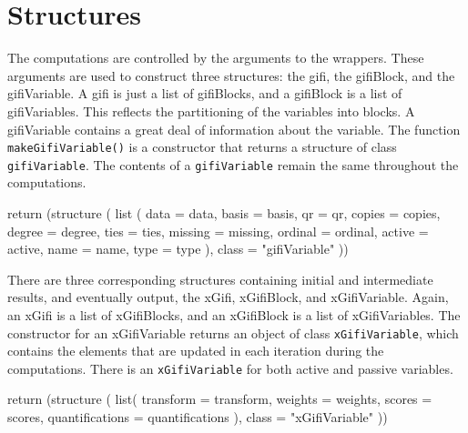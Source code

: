 \documentclass[
  12pt,
  letterpaper,
]{scrbook}
\newenvironment{Shaded}{\begin{snugshade}}{\end{snugshade}}
\newcommand{\AttributeTok}[1]{\textcolor[rgb]{0.40,0.45,0.13}{#1}}
\newcommand{\FunctionTok}[1]{\textcolor[rgb]{0.28,0.35,0.67}{#1}}
\newcommand{\NormalTok}[1]{\textcolor[rgb]{0.00,0.23,0.31}{#1}}
\newcommand{\StringTok}[1]{\textcolor[rgb]{0.13,0.47,0.30}{#1}}
\begin{document}
\section{Structures}\label{structures}

The computations are controlled by the arguments to the wrappers. These
arguments are used to construct three structures: the gifi, the
gifiBlock, and the gifiVariable. A gifi is just a list of gifiBlocks,
and a gifiBlock is a list of gifiVariables. This reflects the
partitioning of the variables into blocks. A gifiVariable contains a
great deal of information about the variable. The function
\texttt{makeGifiVariable()} is a constructor that returns a structure of
class \texttt{gifiVariable}. The contents of a \texttt{gifiVariable}
remain the same throughout the computations.

\begin{Shaded}
\begin{Highlighting}[]
    \FunctionTok{return}\NormalTok{ (}\FunctionTok{structure}\NormalTok{ (}
      \FunctionTok{list}\NormalTok{ (}
        \AttributeTok{data =}\NormalTok{ data,}
        \AttributeTok{basis =}\NormalTok{ basis,}
        \AttributeTok{qr =}\NormalTok{ qr,}
        \AttributeTok{copies =}\NormalTok{ copies,}
        \AttributeTok{degree =}\NormalTok{ degree,}
        \AttributeTok{ties =}\NormalTok{ ties,}
        \AttributeTok{missing =}\NormalTok{ missing,}
        \AttributeTok{ordinal =}\NormalTok{ ordinal,}
        \AttributeTok{active =}\NormalTok{ active,}
        \AttributeTok{name =}\NormalTok{ name,}
        \AttributeTok{type =}\NormalTok{ type}
\NormalTok{      ),}
      \AttributeTok{class =} \StringTok{"gifiVariable"}
\NormalTok{    ))}
\end{Highlighting}
\end{Shaded}

There are three corresponding structures containing initial and
intermediate results, and eventually output, the xGifi, xGifiBlock, and
xGifiVariable. Again, an xGifi is a list of xGifiBlocks, and an
xGifiBlock is a list of xGifiVariables. The constructor for an
xGifiVariable returns an object of class \texttt{xGifiVariable}, which
contains the elements that are updated in each iteration during the
computations. There is an \texttt{xGifiVariable} for both active and
passive variables.

\begin{Shaded}
\begin{Highlighting}[]
 \FunctionTok{return}\NormalTok{ (}\FunctionTok{structure}\NormalTok{ (}
    \FunctionTok{list}\NormalTok{(}
      \AttributeTok{transform =}\NormalTok{ transform,}
      \AttributeTok{weights =}\NormalTok{ weights,}
      \AttributeTok{scores =}\NormalTok{ scores,}
      \AttributeTok{quantifications =}\NormalTok{ quantifications}
\NormalTok{    ),}
    \AttributeTok{class =} \StringTok{"xGifiVariable"}
\NormalTok{  ))}
\end{Highlighting}
\end{Shaded}
\end{document}
